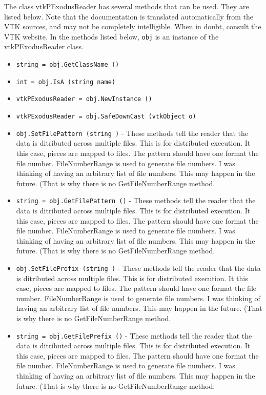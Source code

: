 The class vtkPExodusReader has several methods that can be used.
  They are listed below.
Note that the documentation is translated automatically from the VTK sources,
and may not be completely intelligible.  When in doubt, consult the VTK website.
In the methods listed below, \verb|obj| is an instance of the vtkPExodusReader class.
\begin{itemize}
\item  \verb|string = obj.GetClassName ()|

\item  \verb|int = obj.IsA (string name)|

\item  \verb|vtkPExodusReader = obj.NewInstance ()|

\item  \verb|vtkPExodusReader = obj.SafeDownCast (vtkObject o)|

\item  \verb|obj.SetFilePattern (string )| -  These methods tell the reader that the data is ditributed across
 multiple files. This is for distributed execution. It this case,
 pieces are mapped to files. The pattern should have one %
 format the file number. FileNumberRange is used to generate file
 numbers. I was thinking of having an arbitrary list of file
 numbers. This may happen in the future. (That is why there is no
 GetFileNumberRange method.

\item  \verb|string = obj.GetFilePattern ()| -  These methods tell the reader that the data is ditributed across
 multiple files. This is for distributed execution. It this case,
 pieces are mapped to files. The pattern should have one %
 format the file number. FileNumberRange is used to generate file
 numbers. I was thinking of having an arbitrary list of file
 numbers. This may happen in the future. (That is why there is no
 GetFileNumberRange method.

\item  \verb|obj.SetFilePrefix (string )| -  These methods tell the reader that the data is ditributed across
 multiple files. This is for distributed execution. It this case,
 pieces are mapped to files. The pattern should have one %
 format the file number. FileNumberRange is used to generate file
 numbers. I was thinking of having an arbitrary list of file
 numbers. This may happen in the future. (That is why there is no
 GetFileNumberRange method.

\item  \verb|string = obj.GetFilePrefix ()| -  These methods tell the reader that the data is ditributed across
 multiple files. This is for distributed execution. It this case,
 pieces are mapped to files. The pattern should have one %
 format the file number. FileNumberRange is used to generate file
 numbers. I was thinking of having an arbitrary list of file
 numbers. This may happen in the future. (That is why there is no
 GetFileNumberRange method.


\end{itemize}
